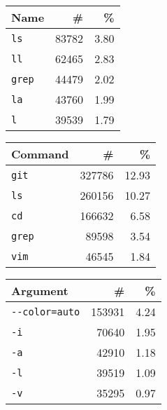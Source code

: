 \begin{tabular}{lrr}
\toprule
   Name &           \# &          \% \\
\midrule
    \verb|ls| &  \num{83782} &  \num{3.80} \\
    \verb|ll| &  \num{62465} &  \num{2.83} \\
  \verb|grep| &  \num{44479} &  \num{2.02} \\
    \verb|la| &  \num{43760} &  \num{1.99} \\
     \verb|l| &  \num{39539} &  \num{1.79} \\
\bottomrule
\end{tabular}
\hspace{0.2cm}
\begin{tabular}{lrr}
    \toprule
           Command &            \# &           \% \\
    \midrule
        \verb|git| &  \num{327786} &  \num{12.93} \\
         \verb|ls| &  \num{260156} &  \num{10.27} \\
         \verb|cd| &  \num{166632} &   \num{6.58} \\
       \verb|grep| &   \num{89598} &   \num{3.54} \\
        \verb|vim| &   \num{46545} &   \num{1.84} \\
    \bottomrule
\end{tabular}
\hspace{0.2cm}
\begin{tabular}{lrr}
    \toprule
                Argument &            \# &          \% \\
    \midrule
     \verb|--color=auto| &  \num{153931} &  \num{4.24} \\
               \verb|-i| &   \num{70640} &  \num{1.95} \\
               \verb|-a| &   \num{42910} &  \num{1.18} \\
               \verb|-l| &   \num{39519} &  \num{1.09} \\
               \verb|-v| &   \num{35295} &  \num{0.97} \\
    \bottomrule
\end{tabular}
